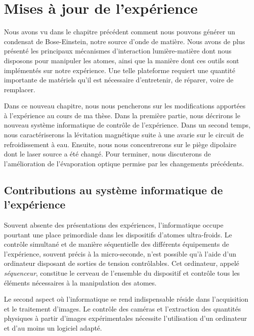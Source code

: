 
\chapter{Mises à jour de l'expérience}
\label{ch:new_exp}

Nous avons vu dans le chapitre précédent comment nous pouvons générer un condensat de Bose-Einstein, notre source d'onde de matière. Nous avons de plus présenté les principaux mécanismes d'interaction lumière-matière dont nous disposons pour manipuler les atomes, ainsi que la manière dont ces outils sont implémentés sur notre expérience. Une telle plateforme requiert une quantité importante de matériels qu'il est nécessaire d'entretenir, de réparer, voire de remplacer. 

Dans ce nouveau chapitre, nous nous pencherons sur les modifications apportées à l'expérience au cours de ma thèse. Dans la première partie, nous décrirons le nouveau système informatique de contrôle de l'expérience. Dans un second temps, nous caractériserons la lévitation magnétique suite à une avarie sur le circuit de refroidissement à eau. Ensuite, nous nous concentrerons sur le piège dipolaire dont le laser source a été changé. Pour terminer, nous discuterons de l'amélioration de l'évaporation optique permise par les changements précédents.

\section{Contributions au système informatique de l'expérience}
Souvent absente des présentations des expériences, l'informatique occupe pourtant une place primordiale dans les dispositifs d'atomes ultra-froids. Le contrôle simultané et de manière séquentielle des différents équipements de l'expérience, souvent précis à la micro-seconde, n'est possible qu'à l'aide d'un ordinateur disposant de sorties de tension contrôlables. Cet ordinateur, appelé \emph{séquenceur}, constitue le cerveau de l'ensemble du dispositif et contrôle tous les éléments nécessaires à la manipulation des atomes.

Le second aspect où l'informatique se rend indispensable réside dans l'acquisition et le traitement d'images. Le contrôle des caméras et l'extraction des quantités physiques à partir d'images expérimentales nécessite l'utilisation d'un ordinateur et d'au moins un logiciel adapté. 


